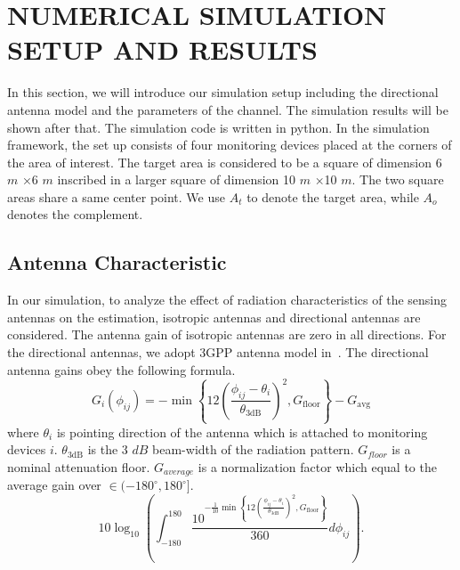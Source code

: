 \chapter{NUMERICAL SIMULATION SETUP AND RESULTS}
In this section, we will introduce our simulation setup including the directional antenna model and the parameters of the channel. The simulation results will be shown after that. The simulation code is written in python. In the simulation framework, the set up consists of four monitoring devices placed
at the corners of the area of interest. The target area is considered to be a square of dimension 6 $m$ ×6 $m$ inscribed in a larger square of dimension 10 $m$ ×10 $m$. The two square areas share a same center point. We use $A_{t}$ to denote the target area, while $A_{o}$ denotes the complement. 

\section{Antenna Characteristic}
In our simulation, to analyze the effect of radiation characteristics of the sensing antennas on the estimation, isotropic antennas and directional antennas are considered. The antenna gain of isotropic antennas are zero in all directions. For the directional antennas, we adopt 3GPP antenna model in~\cite{3GPP-antenna}. The directional antenna gains obey the following formula.
\begin{equation*}
G_i (\phi_{ij}) = - \min \left\{
12 \left( \frac{\phi_{ij} - \theta_{i}}{\theta_{\mathrm{3dB}}} \right)^2,
G_{\mathrm{floor}} \right\} - G_{\mathrm{avg}}
\end{equation*}
where $\theta_{i}$ is pointing direction of the antenna which is attached to monitoring devices $i$. $\theta_{\mathrm{3dB}}$ is the 3 $dB$ beam-width of the radiation pattern. $G_{floor}$ is a nominal attenuation floor. $G_{average}$ is a normalization factor which equal to the average gain over $\in (-180^{\circ}, 180^{\circ}]$.
\begin{equation*}
10 \log_{10} \left( \int_{-180}^{180}
\frac{ 10^{ - \frac{1}{10} \min \left\{
		12 \left( \frac{\phi_{ij} - \theta_{i}}{\theta_{\mathrm{3dB}}} \right)^2,
		G_{\mathrm{floor}} \right\} } }{360} d \phi_{ij} \right) .
\end{equation*}